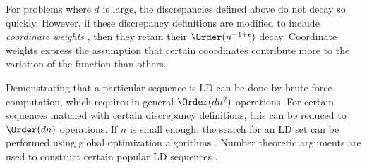 For problems where $d$ is large, the discrepancies defined above do not decay so quickly.  However, if these discrepancy definitions are modified to include \emph{coordinate weights} \cite[Section 4]{DicEtal14a}, then they retain their $\Order(n^{-1 +\epsilon})$ decay. Coordinate weights express the assumption that certain coordinates contribute more to the variation of the function than others.

Demonstrating that a particular sequence is LD can be done by brute force computation, which requires in general $\Order(dn^2)$ operations. For certain sequences matched with certain discrepancy definitions, this can be reduced to $\Order(dn)$ operations. If $n$ is small enough, the search for an LD set can be performed using global optimization algorithms \cite{WinFan97a}.  Number theoretic arguments are used to construct certain popular LD sequences \cite{DicPil10a,Nie92}.



